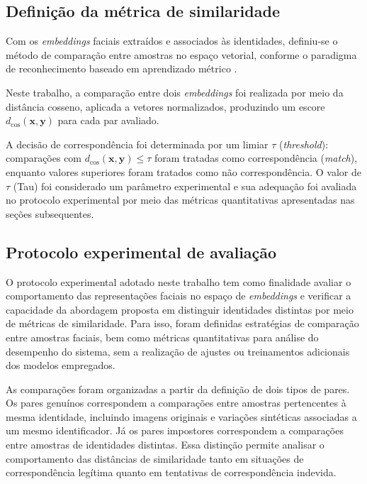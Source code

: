
\subsection{Definição da métrica de similaridade}

Com os \textit{embeddings} faciais extraídos e associados às identidades, definiu-se o método de comparação entre amostras no espaço vetorial, conforme o paradigma de reconhecimento baseado em aprendizado métrico \cite{schroff2015facenet}.

Neste trabalho, a comparação entre dois \textit{embeddings} foi realizada por meio da distância cosseno, aplicada a vetores normalizados, produzindo um escore $d_{\cos}(\mathbf{x}, \mathbf{y})$ para cada par avaliado.

A decisão de correspondência foi determinada por um limiar $\tau$ (\textit{threshold}): comparações com $d_{\cos}(\mathbf{x}, \mathbf{y}) \leq \tau$ foram tratadas como correspondência (\textit{match}), enquanto valores superiores foram tratados como não correspondência. O valor de $\tau$ (Tau) foi considerado um parâmetro experimental e sua adequação foi avaliada no protocolo experimental por meio das métricas quantitativas apresentadas nas seções subsequentes.



\subsection{Protocolo experimental de avaliação}

O protocolo experimental adotado neste trabalho tem como finalidade avaliar o comportamento das representações faciais no espaço de \textit{embeddings} e verificar a capacidade da abordagem proposta em distinguir identidades distintas por meio de métricas de similaridade. Para isso, foram definidas estratégias de comparação entre amostras faciais, bem como métricas quantitativas para análise do desempenho do sistema, sem a realização de ajustes ou treinamentos adicionais dos modelos empregados.

As comparações foram organizadas a partir da definição de dois tipos de pares. Os pares genuínos correspondem a comparações entre amostras pertencentes à mesma identidade, incluindo imagens originais e variações sintéticas associadas a um mesmo identificador. Já os pares impostores correspondem a comparações entre amostras de identidades distintas. Essa distinção permite analisar o comportamento das distâncias de similaridade tanto em situações de correspondência legítima quanto em tentativas de correspondência indevida.

